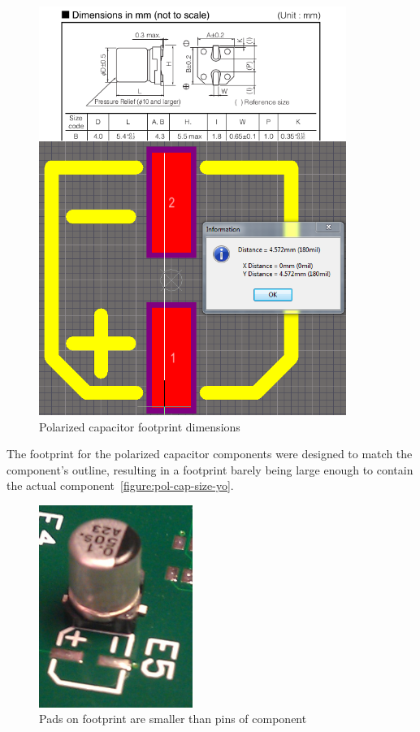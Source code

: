 \begin{figure}
\centering
\includegraphics[width=10cm,keepaspectratio]{pcb/pol_cap_size_footprint_vs_specs.png}
\caption{Polarized capacitor footprint dimensions}
\label{figure:pol-cap-size-yo}
\end{figure}

The footprint for the polarized capacitor components were designed to match the component's outline, resulting in a footprint barely being large enough to contain the actual component~\vref{figure:pol-cap-size-yo}.

\begin{figure}
\centering
\includegraphics[width=5cm,keepaspectratio]{pcb/pol_cap_size_on_board.png}
\caption{Pads on footprint are smaller than pins of component}
\label{figure:pol-cap-size-board}
\end{figure}

